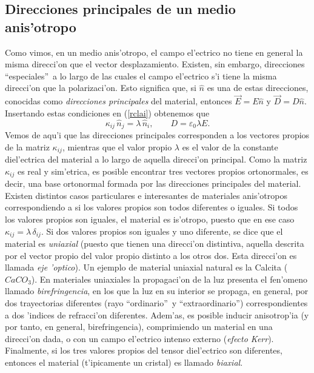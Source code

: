 \subsection{Direcciones principales de un medio anis'otropo}\label{secDP}

Como vimos, en un medio anis'otropo, el campo el'ectrico no tiene en general
la misma direcci'on que el vector desplazamiento.
Existen, sin embargo, direcciones ``especiales''\, a lo largo de las cuales el
campo el'ectrico s'i tiene la misma direcci'on que la polarizaci'on. Esto significa
que, si $\hat{n}$ es una de estas direcciones, conocidas como \textit{direcciones
principales} del material, entonces $\vec{E}=E\hat{n}$ y $\vec{D}=D\hat{n}$.
Insertando estas condiciones en (\ref{rclai}) obtenemos que
\begin{equation}
\kappa_{ij}\,\hat{n}_j= \lambda\,\hat{n}_i, \qquad D=\varepsilon_0\lambda E.
\end{equation}
Vemos de aqu'i que las direcciones principales corresponden a los vectores
propios de la matriz  $\kappa_{ij}$, mientras que el valor propio $\lambda$ es
el valor de la constante diel'ectrica del material a lo largo de aquella
direcci'on principal. Como la matriz $\kappa_{ij}$ es real y sim'etrica, es
posible encontrar tres vectores propios ortonormales, es decir, una base
ortonormal formada por las direcciones principales del material. Existen
distintos casos particulares e interesantes de materiales anis'otropos
correspondiendo a si los valores propios son todos diferentes o iguales. Si
todos los valores propios son iguales, el material es is'otropo, puesto que en
ese caso $\kappa_{ij}=\lambda\,\delta_{ij}$. Si dos valores propios son iguales
y uno diferente, se dice que el material es \textit{uniaxial} (puesto que
tienen una direcci'on distintiva, aquella descrita por el vector propio del
valor propio distinto a los otros dos. Esta direcci'on es llamada \textit{eje
'optico}). Un ejemplo de material uniaxial natural es la Calcita ($CaCO_3$). En
materiales uniaxiales la propagaci'on de la luz presenta el fen'omeno llamado
\textit{birefringencia}, en los que la luz en su interior se propaga, en
general, por dos trayectorias diferentes (rayo ``ordinario''\, y
``extraordinario'') correspondientes a dos 'indices de refracci'on diferentes.
Adem'as, es posible inducir anisotrop'ia (y por tanto, en general,
birefringencia), comprimiendo un material en una direcci'on dada, o
con un campo el'ectrico intenso externo (\textit{efecto Kerr}). Finalmente, si
los tres valores propios del tensor diel'ectrico son diferentes, entonces el
material (t'ipicamente un cristal) es llamado \textit{biaxial}.


